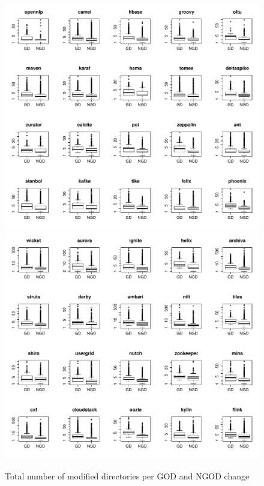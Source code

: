\begin{figure}[tb]
	\centering
	\includegraphics[width=120mm]{figures/chapter4/rq3_god_nd_logged_1}
	\includegraphics[width=120mm]{figures/chapter4/rq3_god_nd_logged_2}
	\caption{Total number of modified directories per GOD and NGOD change}
	\label{figure:total_nd_changed_god_vs_ngod}
\end{figure}



